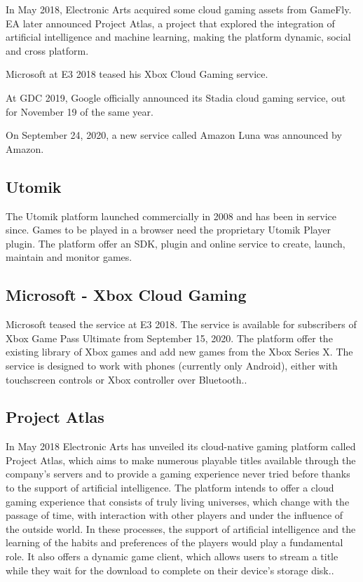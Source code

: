 In May 2018, Electronic Arts acquired some cloud gaming assets from GameFly. EA later announced Project Atlas, a project that explored the integration of artificial intelligence and machine learning, making the platform dynamic, social and cross platform.

Microsoft at E3 2018 teased his Xbox Cloud Gaming service.

At GDC 2019, Google officially announced its Stadia cloud gaming service, out for November 19 of the same year.

On September 24, 2020, a new service called Amazon Luna was announced by Amazon\cite{Cloud_gaming_history}.
\subsection{Utomik}
The Utomik platform launched commercially in 2008 and has been in service since. Games to be played in a browser need the proprietary Utomik Player plugin. The platform offer an SDK, plugin and online service to create, launch, maintain and monitor games\cite{Utomik}.
\subsection{Microsoft - Xbox Cloud Gaming}
Microsoft teased the service at E3 2018. The service is available for subscribers of Xbox Game Pass Ultimate from September 15, 2020. The platform offer the existing library of Xbox games and add new games from the Xbox Series X. The service is designed to work with phones (currently only Android), either with touchscreen controls or Xbox controller over Bluetooth.\cite{Xbox_Game_Pass_cloud_gaming}.
\subsection{Project Atlas}
In May 2018 Electronic Arts has unveiled its cloud-native gaming platform called Project Atlas, which aims to make numerous playable titles available through the company's servers and to provide a gaming experience never tried before thanks to the support of artificial intelligence. The platform intends to offer a cloud gaming experience that consists of truly living universes, which change with the passage of time, with interaction with other players and under the influence of the outside world. In these processes, the support of artificial intelligence and the learning of the habits and preferences of the players would play a fundamental role. It also offers a dynamic game client, which allows users to stream a title while they wait for the download to complete on their device's storage disk.\cite{Project_Atlas}.
